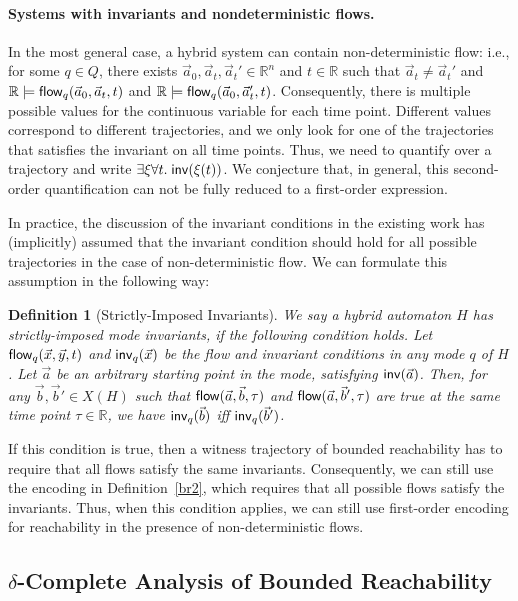 \documentclass[journal]{IEEEtran}
\newtheorem{definition}{Definition}
\begin{document}
\paragraph{Systems with invariants and nondeterministic flows.} In the most general case, a hybrid system can contain non-deterministic flow: i.e., for some $q\in Q$, there exists $\vec a_0, \vec a_t, \vec a_t'\in \mathbb{R}^n$ and $t\in\mathbb{R}$ such that $\vec a_t\neq \vec a_t'$ and $\mathbb{R}\models \mathsf{flow}_q(\vec a_0, \vec a_t, t)$ and $\mathbb{R}\models \mathsf{flow}_q(\vec a_0, \vec a_t', t)$. Consequently, there is multiple possible values for the continuous variable for each time point. Different values correspond to different trajectories, and we only look for one of the trajectories that satisfies the invariant on all time points. Thus, we need to quantify over a trajectory and write $\exists \xi \forall t.\; \mathsf{inv}(\xi(t))$. We conjecture that, in general, this second-order quantification can not be fully reduced to a first-order expression.

In practice, the discussion of the invariant conditions in the existing work has (implicitly) assumed that the invariant condition should hold for all possible trajectories in the case of non-deterministic flow. We can formulate this assumption in the following way:
\begin{definition}[Strictly-Imposed Invariants]
We say a hybrid automaton $H$ has strictly-imposed mode invariants, if the following condition holds. Let $\mathsf{flow}_q(\vec x, \vec y, t)$ and $\mathsf{inv}_q(\vec x)$ be the flow and invariant conditions in any mode $q$ of $H$. Let $\vec a$ be an arbitrary starting point in the mode, satisfying $\mathsf{inv}(\vec a)$. Then, for any  $\vec b, \vec b'\in X(H)$ such that $\mathsf{flow}(\vec a, \vec b, \tau)$ and $\mathsf{flow}(\vec a, \vec b', \tau)$ are true at the same time point $\tau\in \mathbb{R}$, we have $\mathsf{inv}_q(\vec b)$ iff $\mathsf{inv}_q (\vec b')$.
\end{definition}
If this condition is true, then a witness trajectory of bounded reachability has to require that all flows satisfy the same invariants. Consequently, we can still use the encoding in Definition~\ref{br2}, which requires that all possible flows satisfy the invariants. Thus, when this condition applies, we can still use first-order encoding for reachability in the presence of non-deterministic flows.

\subsection{$\delta$-Complete Analysis of Bounded Reachability}
\end{document}
